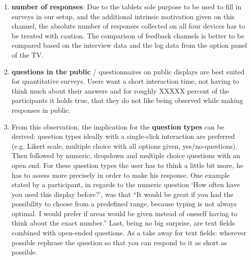 	\begin{enumerate}
	\item \textbf{number of responses}: Due to the tablets sole purpose to be used to fill in surveys in our setup, and the additional intrinsic motivation given on this channel, the absolute number of responses collected on all four devices has to be treated with caution. The comparison of feedback channels is better to be compared based on the interview data and the log data from the option panel of the TV.

	\item \textbf{questions in the public} / questionnaires on public displays are best suited for quantitative surveys. Users want a short interaction time, not having to think much about their answers and for roughly XXXXX percent of the participants it holds true, that they do not like being observed while making responses in public.

	\item From this observation, the implication for the \textbf{question types} can be derived: question types ideally with a single-click interaction are preferred (e.g. Likert scale, multiple choice with all options given, yes/no-questions). Then followed by numeric, dropdown and multiple choice questions with an open end. For these question types the user has to think a little bit more, he has to assess more precisely in order to make his response. One example stated by a participant, in regards to the numeric question `How often have you used this display before?', was that ``It would be great if you had the possibility to choose from a predefined range, because typing is not always optimal. I would prefer if areas would be given instead of oneself having to think about the exact number.'' Last, being no big surprise, are text fields combined with open-ended questions. As a take away for text fields: wherever possible rephrase the question so that you can respond to it as short as possible.


\end{enumerate}
